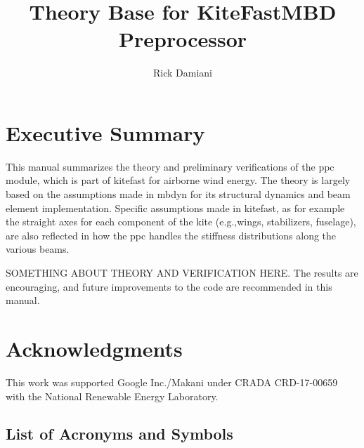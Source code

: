 \documentclass[report]{nrel}
\author{Rick Damiani}
\title{Theory Base for KiteFastMBD Preprocessor}
\let\firstchar\lowercase
\let\oldprintglossary\printglossary
\def\printglossary{\let\firstchar\uppercase\oldprintglossary}
\def\eg{e.g., }
\def\eg{e.g.,}
\begin{document}
\glsdisablehyper

\frontmatter
\setcounter{page}{4}
\chapter*{Executive Summary}
This manual summarizes the theory and preliminary verifications of the \gls{ppc} module, which is part of \gls{kitefast} for airborne wind energy. 
The theory is largely based on the assumptions made in \gls{mbdyn} for its structural dynamics and beam element implementation. Specific assumptions made in \gls{kitefast}, as for example the straight axes for each component of the kite (\eg wings, stabilizers, fuselage), are also reflected in how the \gls{ppc} handles the stiffness distributions along the various beams.

  SOMETHING ABOUT THEORY AND VERIFICATION HERE. The results are encouraging, and future improvements to the code are recommended in this manual. 
\chapter*{Acknowledgments}
This work was supported Google Inc./Makani under CRADA CRD-17-00659 with the National Renewable Energy Laboratory. 

\glsresetall


\tableofcontents

\listoffigures
\listoftables
\section*{\Large{List of Acronyms and Symbols}}\label{sec:symbols}
\printglossary[type=\acronymtype,style=long]
\printglossary[type=symbolslist,style=long, title=Symbols]
\printglossary[type=greek,style=long, title=Greek Symbols]
\let\firstchar\lowercase %

\mainmatter
\lstset{language=[LaTeX]Tex,columns=fullflexible,keepspaces=true,breaklines=true}




\end{document}

